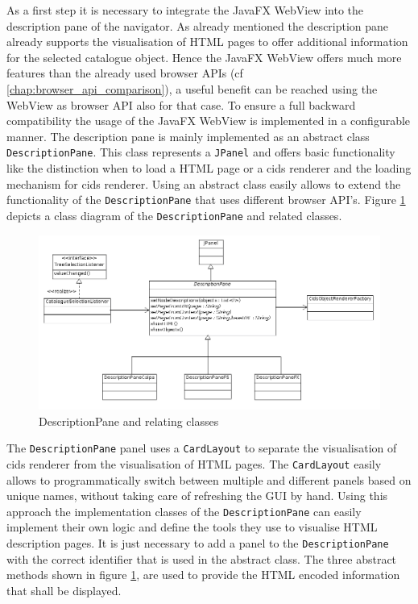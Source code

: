 As a first step it is necessary to integrate the JavaFX WebView into the description pane of the navigator.
As already mentioned the description pane already supports the visualisation of HTML pages to offer additional information for the selected catalogue object. 
Hence the JavaFX WebView offers much more features than the already used browser APIs (cf \ref{chap:browser_api_comparison}), a useful benefit can be reached using the WebView as browser API also for that case. 
To ensure a full backward compatibility the usage of the JavaFX WebView is implemented in a configurable manner. 
The description pane is mainly implemented as an abstract class \texttt{DescriptionPane}. 
This class represents a \texttt{JPanel} and offers basic functionality like the distinction when to load a HTML page or a cids renderer and the loading mechanism for cids renderer. 
Using an abstract class easily allows to extend the functionality of the \texttt{DescriptionPane} that uses different browser API's.  
Figure \ref{fig:class_diag_desc_pane} depicts a class diagram of the \texttt{DescriptionPane} and related classes.

\begin{figure}
	\centering	\includegraphics[width=1.0\textwidth]{./img/classDiagramms/description_pane.png}
	\caption{DescriptionPane and relating classes}
	\label{fig:class_diag_desc_pane}
\end{figure}

The \texttt{DescriptionPane} panel uses a \texttt{CardLayout} to separate the visualisation of cids renderer from the visualisation of HTML pages.
The \texttt{CardLayout} easily allows to programmatically switch between multiple and different panels based on unique names, without taking care of refreshing the GUI by hand.
Using this approach the implementation classes of the \texttt{DescriptionPane} can easily implement their own logic and define the tools they use to visualise HTML description pages.
It is just necessary to add a panel to the \texttt{DescriptionPane} with the correct identifier that is used in the abstract class.
The three abstract methods shown in figure \ref{fig:class_diag_desc_pane}, are used to provide the HTML encoded information that shall be displayed.

